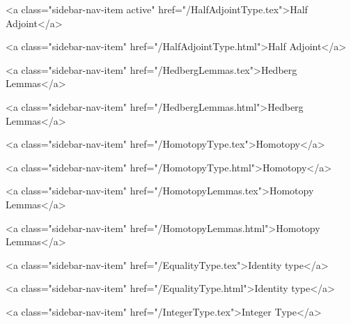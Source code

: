           <a class="sidebar-nav-item active" href="/HalfAdjointType.tex">Half Adjoint</a>
        
      
    
      
        
          <a class="sidebar-nav-item" href="/HalfAdjointType.html">Half Adjoint</a>
        
      
    
      
        
          <a class="sidebar-nav-item" href="/HedbergLemmas.tex">Hedberg Lemmas</a>
        
      
    
      
        
          <a class="sidebar-nav-item" href="/HedbergLemmas.html">Hedberg Lemmas</a>
        
      
    
      
        
          <a class="sidebar-nav-item" href="/HomotopyType.tex">Homotopy</a>
        
      
    
      
        
          <a class="sidebar-nav-item" href="/HomotopyType.html">Homotopy</a>
        
      
    
      
        
          <a class="sidebar-nav-item" href="/HomotopyLemmas.tex">Homotopy Lemmas</a>
        
      
    
      
        
          <a class="sidebar-nav-item" href="/HomotopyLemmas.html">Homotopy Lemmas</a>
        
      
    
      
        
          <a class="sidebar-nav-item" href="/EqualityType.tex">Identity type</a>
        
      
    
      
        
          <a class="sidebar-nav-item" href="/EqualityType.html">Identity type</a>
        
      
    
      
        
          <a class="sidebar-nav-item" href="/IntegerType.tex">Integer Type</a>
        
      
    
      
        
